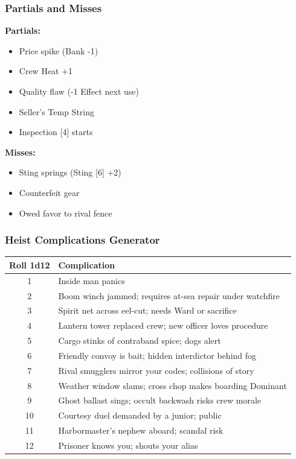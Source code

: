 \documentclass[11pt]{article}
\begin{document}
\subsubsection{Partials and Misses}

\textbf{Partials:}
\begin{itemize}
    \item Price spike (Bank -1)
    \item Crew Heat +1
    \item Quality flaw (-1 Effect next use)
    \item Seller's Temp String
    \item Inspection [4] starts
\end{itemize}

\textbf{Misses:}
\begin{itemize}
    \item Sting springs (Sting [6] +2)
    \item Counterfeit gear
    \item Owed favor to rival fence
\end{itemize}

\subsubsection{Heist Complications Generator}

\begin{center}
\begin{longtable}{|c|p{10cm}|}
\hline
\textbf{Roll 1d12} & \textbf{Complication} \\
\hline
1 & Inside man panics \\
2 & Boom winch jammed; requires at-sea repair under watchfire \\
3 & Spirit net across eel-cut; needs Ward or sacrifice \\
4 & Lantern tower replaced crew; new officer loves procedure \\
5 & Cargo stinks of contraband spice; dogs alert \\
6 & Friendly convoy is bait; hidden interdictor behind fog \\
7 & Rival smugglers mirror your codes; collisions of story \\
8 & Weather window slams; cross chop makes boarding Dominant \\
9 & Ghost ballast sings; occult backwash risks crew morale \\
10 & Courtesy duel demanded by a junior; public \\
11 & Harbormaster's nephew aboard; scandal risk \\
12 & Prisoner knows you; shouts your alias \\
\hline
\end{longtable}
\end{center}
\end{document}
